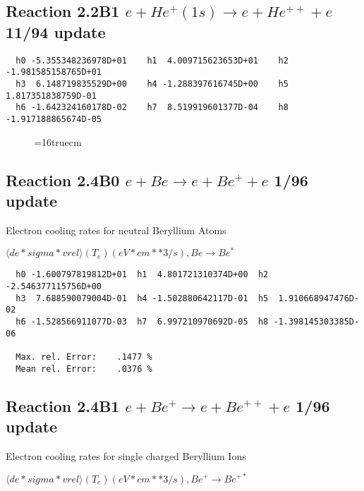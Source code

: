 \documentclass[12pt,dvipdfmx]{article}
\begin{document}
\subsection{
Reaction 2.2B1 $e + He^+(1s) \rightarrow e + He^{++} + e$ 11/94 update
}


\begin{small}\begin{verbatim}
  h0 -5.355348236978D+01    h1  4.009715623653D+01    h2 -1.981585158765D+01
  h3  6.148719835529D+00    h4 -1.288397616745D+00    h5  1.817351838759D-01
  h6 -1.642324160178D-02    h7  8.519919601377D-04    h8 -1.917188865674D-05
\end{verbatim}\end{small}

\begin{figure} \label{e2.2B}
\epsfxsize=16truecm
\end{figure}
\newpage

\subsection{
Reaction 2.4B0 $e + Be \rightarrow e + Be^+ + e $ 1/96 update
}

  Electron cooling rates for neutral
  Beryllium Atoms

 $ \langle de*sigma*vrel \rangle(T_e)  (eV*cm**3/s), Be  \rightarrow Be^*$

\begin{small}\begin{verbatim}
  h0 -1.600797819812D+01  h1  4.801721310374D+00  h2 -2.546377115756D+00
  h3  7.688590079004D-01  h4 -1.502880642117D-01  h5  1.910668947476D-02
  h6 -1.528566911077D-03  h7  6.997210970692D-05  h8 -1.398145303385D-06

  Max. rel. Error:    .1477 %
  Mean rel. Error:    .0376 %

\end{verbatim}\end{small}


\subsection{
Reaction 2.4B1 $e + Be^+ \rightarrow e + Be^{++} + e $ 1/96 update
}

  Electron cooling rates for single
  charged Beryllium Ions

 $ \langle de*sigma*vrel \rangle(T_e)  (eV*cm**3/s), Be^+ \rightarrow Be^{+*} $
\end{document}
